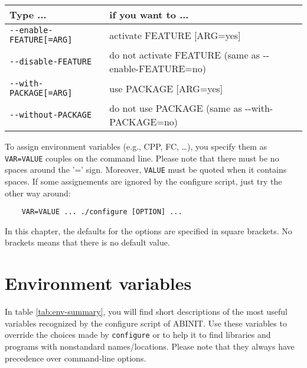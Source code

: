 \begin{center}
\begin{tabular}{|l|p{7cm}|}
\hline 
\textbf{Type ...}  & \textbf{if you want to ...} \tabularnewline
\hline 
\texttt{-{-}enable-FEATURE{[}=ARG{]}}  & activate FEATURE {[}ARG=yes{]} \tabularnewline
\texttt{-{-}disable-FEATURE}  & do not activate FEATURE (same as \hbox{-{-}enable-FEATURE}=no) \tabularnewline
\hline 
\texttt{-{-}with-PACKAGE{[}=ARG{]}}  & use PACKAGE {[}ARG=yes{]} \tabularnewline
\texttt{-{-}without-PACKAGE}  & do not use PACKAGE (same as \hbox{-{-}with-PACKAGE}=no) \tabularnewline
\hline
\end{tabular}
\par\end{center}

To assign environment variables (e.g., CPP, FC, \ldots{}), you specify
them as \texttt{VAR=VALUE} couples on the command line. Please note
that there must be no spaces around the '=' sign. Moreover, \texttt{VALUE}
must be quoted when it contains spaces. If some assignements are ignored
by the configure script, just try the other way around:\begin{verbatim}
    VAR=VALUE ... ./configure [OPTION] ...
\end{verbatim}

In this chapter, the defaults for the options are specified in square
brackets. No brackets means that there is no default value.


\section{Environment variables}

In table \ref{tab:env-summary}, you will find short descriptions
of the most useful variables recognized by the configure script of
ABINIT. Use these variables to override the choices made by \texttt{configure}
or to help it to find libraries and programs with nonstandard names/locations.
Please note that they always have precedence over command-line options.
\\


